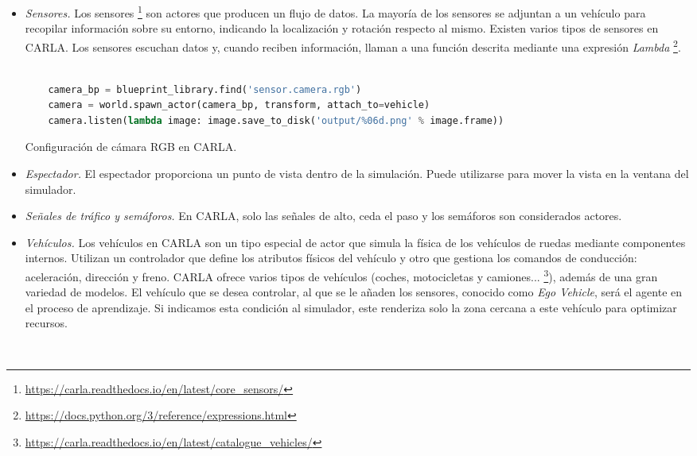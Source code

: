 \begin{itemize}
    \item \textit{Sensores.} Los sensores \footnote{\url{https://carla.readthedocs.io/en/latest/core_sensors/}} son actores que producen un flujo de datos. La mayoría de los sensores se adjuntan a un vehículo para recopilar información sobre su entorno, indicando la localización y rotación respecto al mismo. Existen varios tipos de sensores en CARLA. Los sensores escuchan datos y, cuando reciben información, llaman a una función descrita mediante una expresión \textit{Lambda} \footnote{\url{https://docs.python.org/3/reference/expressions.html}}. 

	\begin{code}[h]
	\begin{lstlisting}[language=python]
	
	camera_bp = blueprint_library.find('sensor.camera.rgb')
	camera = world.spawn_actor(camera_bp, transform, attach_to=vehicle)
	camera.listen(lambda image: image.save_to_disk('output/%06d.png' % image.frame))

	\end{lstlisting}
	\caption[Configuración de cámara RGB en CARLA]{Configuración de cámara RGB en CARLA.}
	\label{cod:camara_carla}
	\end{code}

    \item \textit{Espectador.} El espectador  proporciona un punto de vista dentro de la simulación. Puede utilizarse para mover la vista en la ventana del simulador.
    \item \textit{Señales de tráfico y semáforos.} En CARLA, solo las señales de alto, ceda el paso y los semáforos son considerados actores.

    \item  \textit{Vehículos.} Los vehículos en CARLA son un tipo especial de actor que simula la física de los vehículos de ruedas mediante componentes internos. Utilizan un controlador que define los atributos físicos del vehículo y otro que gestiona los comandos de conducción: aceleración, dirección y freno. CARLA ofrece varios tipos de vehículos (coches, motocicletas y camiones... \footnote{\url{https://carla.readthedocs.io/en/latest/catalogue_vehicles/}}), además de una gran variedad de modelos. El vehículo que se desea controlar, al que se le añaden los sensores, conocido como \textit{Ego Vehicle}, será el agente en el proceso de aprendizaje. Si indicamos esta condición al simulador, este renderiza solo la zona cercana a este vehículo para optimizar recursos.
	\begin{code}[h]
	\begin{lstlisting}[language=python]
	

\end{lstlisting}
\end{code}
\end{itemize}
